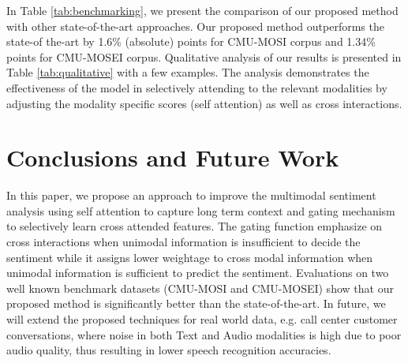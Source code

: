 \documentclass{article}
\begin{document}
In Table \ref{tab:benchmarking}, we present the comparison of our proposed method with other state-of-the-art approaches. 
Our proposed method outperforms the state-of the-art by 1.6\% (absolute) points for CMU-MOSI corpus and 1.34\% points for CMU-MOSEI corpus. 
Qualitative analysis of our results is presented in Table \ref{tab:qualitative} with a few examples. The analysis demonstrates the effectiveness of the model in selectively attending to the relevant modalities by adjusting the modality specific scores (self attention) as well as cross interactions.

\section{Conclusions and Future Work}
In this paper, we propose an approach to improve the multimodal sentiment analysis using self attention to capture long term context and gating mechanism to selectively learn cross attended features. The gating function emphasize on cross interactions when unimodal information is insufficient to decide the sentiment while it assigns lower weightage to cross modal information when unimodal information is sufficient to predict the sentiment. Evaluations on two well known benchmark datasets (CMU-MOSI and CMU-MOSEI) show that our proposed method is significantly better than the state-of-the-art. In future, we will extend the proposed techniques for real world data, e.g. call center customer conversations, where noise in both Text and Audio modalities is high due to poor audio quality, thus resulting in lower speech recognition accuracies.




\end{document}
